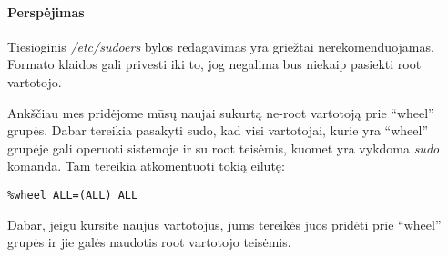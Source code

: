     \paragraph{Perspėjimas} Tiesioginis \textsl{/etc/sudoers} bylos
    redagavimas yra griežtai nerekomenduojamas. Formato klaidos gali
    privesti iki to, jog negalima bus niekaip pasiekti root vartotojo.

    Ankščiau mes pridėjome mūsų naujai sukurtą ne-root vartotoją prie
    ``wheel'' grupės. Dabar tereikia pasakyti sudo, kad visi
    vartotojai, kurie yra ``wheel'' grupėje gali operuoti sistemoje ir
    su root teisėmis, kuomet yra vykdoma \textsl{sudo} komanda. Tam
    tereikia atkomentuoti tokią eilutę:

    \begin{verbatim}
%wheel ALL=(ALL) ALL
    \end{verbatim}

    Dabar, jeigu kursite naujus vartotojus, jums tereikės juos pridėti
    prie ``wheel'' grupės ir jie galės naudotis root vartotojo teisėmis.
